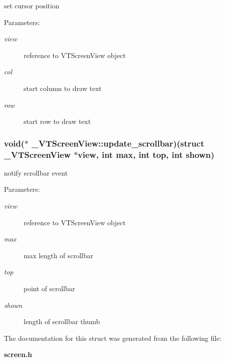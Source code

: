 set cursor position

\begin{Desc}
\item[Parameters:]
\begin{description}
\item[{\em view}]reference to VTScreen\-View object \item[{\em col}]start column to draw text \item[{\em row}]start row to draw text \end{description}
\end{Desc}
\subsubsection{\setlength{\rightskip}{0pt plus 5cm}void($\ast$ \_\-VTScreen\-View::update\_\-scrollbar)(struct \_\-VTScreen\-View $\ast$view, int max, int top, int shown)}\label{struct__VTScreenView_m9}


notify scrollbar event

\begin{Desc}
\item[Parameters:]
\begin{description}
\item[{\em view}]reference to VTScreen\-View object \item[{\em max}]max length of scrollbar \item[{\em top}]point of scrollbar \item[{\em shown}]length of scrollbar thumb \end{description}
\end{Desc}


The documentation for this struct was generated from the following file:\begin{CompactItemize}
\item 
{\bf screen.h}\end{CompactItemize}
